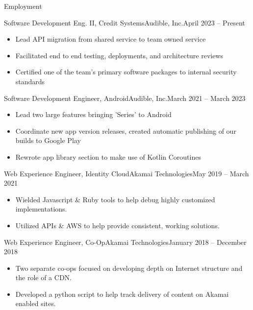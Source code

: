 \documentclass[]{mcdowellcv}
\begin{document}
	\makeheader
	
	\begin{cvsection}{Employment}
		\begin{cvsubsection}{Software Development Eng. II, Credit Systems}{Audible, Inc.}{April 2023 -- Present}
		\vspace{2mm}
			\begin{itemize}
				\item Lead API migration from shared service to team owned service
				\item Facilitated end to end testing, deployments, and architecture reviews
				\item Certified one of the team's primary software packages to internal security standards
			\end{itemize}
		\end{cvsubsection}
		
		\begin{cvsubsection}{Software Development Engineer, Android}{Audible, Inc.}{March 2021 -- March 2023}
		\vspace{2mm}
			\begin{itemize}
				\item Lead two large features bringing 'Series' to Android
				\item Coordinate new app version releases, created automatic publishing of our builds to Google Play
				\item Rewrote app library section to make use of Kotlin Coroutines
			\end{itemize}
		\end{cvsubsection}
		
		\begin{cvsubsection}{Web Experience Engineer, Identity Cloud}{Akamai Technologies}{May 2019 -- March 2021}
		\vspace{2mm}
			\begin{itemize}
				\item Wielded Javascript \& Ruby tools to help debug highly customized implementations.
				\item Utilized APIs \& AWS to help provide consistent, working solutions.
			\end{itemize}
		\end{cvsubsection}
		
		\begin{cvsubsection}{Web Experience Engineer, Co-Op}{Akamai Technologies}{January 2018 -- December 2018}
		\vspace{2mm}
			\begin{itemize}
				\item Two separate co-ops focused on developing depth on Internet structure and the role of a CDN.
				\item Developed a python script to help track delivery of content on Akamai enabled sites.
			\end{itemize}
		\end{cvsubsection}
		

\end{cvsection}
\end{document}
